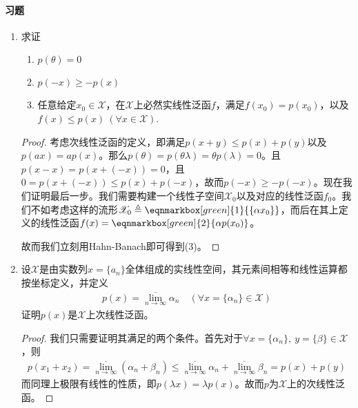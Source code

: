 	\paragraph{习题}
	\begin{enumerate}[leftmargin=2cm, label=\arabic*]
		\item 求证
		\begin{enumerate}[leftmargin=1cm, label=(\arabic*)]
			\item $p(\theta) = 0$
			\item $p(-x) \geqslant -p(x)$
			\item 任意给定$x_0\in\mathscr{X}$，在$\mathscr{X}$上必然实线性泛函$f$，满足$f(x_0) = p(x_0)$，以及$f(x)\leqslant p(x)\ (\forall x\in\mathscr{X})$.
		\end{enumerate}
		\begin{proof}
			考虑次线性泛函的定义，即满足$p(x+y)\leqslant p(x) + p(y)$以及$p(ax) = ap(x)$。那么$p(\theta) = p(\theta \lambda) = \theta p(\lambda) = 0$。且$p(x-x) = p(x + (-x)) = 0$，且$0 = p(x+ (-x))\leqslant p(x) + p(-x) $，故而$p(-x)\geqslant -p(-x)$。现在我们证明最后一步。我们需要构建一个线性子空间$\mathscr{X}_0$以及对应的线性泛函$f_0$。我们不如考虑这样的流形$\mathscr{X}_0 \triangleq \eqnmarkbox[green]{1}{\{\alpha x_0\}}$，而后在其上定义的线性泛函$f(x) = \eqnmarkbox[green]{2}{\alpha p(x_0)}$。
			\vspace{1.5em}
			
			故而我们立刻用Hahn-Banach即可得到(3)。
		\end{proof}
		\item 设$\mathscr{X}$是由实数列$x = \{a_n\}$全体组成的实线性空间，其元素间相等和线性运算都按坐标定义，并定义
		\begin{align*}
			p(x) = \overline{\lim\limits_{n\to\infty}} \alpha_n \quad (\forall x = \{\alpha_n\}\in \mathscr{X})
		\end{align*}
		证明$p(x)$是$\mathscr{X}$上次线性泛函。
		\begin{proof}
			我们只需要证明其满足的两个条件。首先对于$\forall x = \{\alpha_n\},\ y=\{\beta\}\in\mathscr{X}$，则
			\begin{align*}
				p(x_1 + x_2) = \overline{\lim\limits_{n\to\infty}} (\alpha_n + \beta_n) \leqslant \overline{\lim\limits_{n\to\infty}} \alpha_n + \overline{\lim\limits_{n\to\infty}} \beta_n = p(x) + p(y)
			\end{align*}
			而同理上极限有线性的性质，即$p(\lambda x) = \lambda p(x)$。故而$p$为$\mathscr{X}$上的次线性泛函。
		\end{proof}
		

\end{enumerate}
